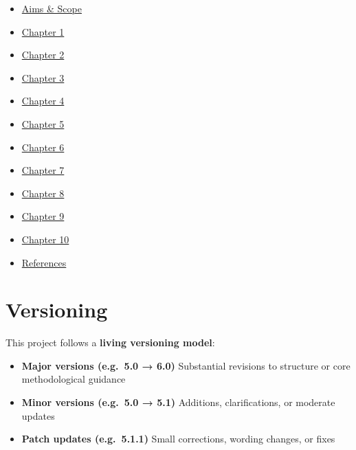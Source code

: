 \documentclass[
  letterpaper,
  DIV=11,
  numbers=noendperiod]{scrreprt}
\providecommand{\tightlist}{%
  \setlength{\itemsep}{0pt}\setlength{\parskip}{0pt}}
\begin{document}
\begin{itemize}
\tightlist
\item
  \href{AimsScope.qmd}{Aims \& Scope}\\
\item
  \href{Chapter_1.qmd}{Chapter 1}\\
\item
  \href{Chapter_2.qmd}{Chapter 2}\\
\item
  \href{Chapter_3.qmd}{Chapter 3}\\
\item
  \href{Chapter_4.qmd}{Chapter 4}\\
\item
  \href{Chapter_5.qmd}{Chapter 5}\\
\item
  \href{Chapter_6.qmd}{Chapter 6}\\
\item
  \href{Chapter_7.qmd}{Chapter 7}\\
\item
  \href{Chapter_8.qmd}{Chapter 8}\\
\item
  \href{Chapter_9.qmd}{Chapter 9}\\
\item
  \href{Chapter_10.qmd}{Chapter 10}\\
\item
  \href{references.qmd}{References}
\end{itemize}

\section*{Versioning}\label{versioning}


This project follows a \textbf{living versioning model}:

\begin{itemize}
\item
  \textbf{Major versions (e.g.~5.0 → 6.0)} Substantial revisions to
  structure or core methodological guidance
\item
  \textbf{Minor versions (e.g.~5.0 → 5.1)} Additions, clarifications, or
  moderate updates
\item
  \textbf{Patch updates (e.g.~5.1.1)} Small corrections, wording
  changes, or fixes
\end{itemize}
\end{document}

